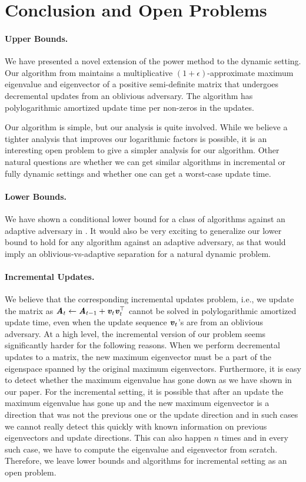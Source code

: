 

\section{Conclusion and Open Problems}\label{sec:open}


\paragraph{Upper Bounds.}
We have presented a novel extension of the power method to the dynamic setting. Our algorithm from  maintains a multiplicative $(1+\epsilon)$-approximate maximum eigenvalue and eigenvector of a positive semi-definite matrix that undergoes decremental updates from an oblivious adversary. The algorithm has polylogarithmic amortized update time per non-zeros in the updates. 

Our algorithm is simple, but our analysis is quite involved. While we believe a tighter analysis that improves our logarithmic factors is possible, it is an interesting open problem to give a simpler analysis for our algorithm. 
%
Other natural questions are whether we can get similar algorithms in incremental or fully dynamic settings and whether one can get a worst-case update time.


\paragraph{Lower Bounds.}
We have shown a conditional lower bound for a class of algorithms against an adaptive adversary in . It would also be very exciting to generalize our lower bound to hold for any algorithm against an adaptive adversary, as that would imply an oblivious-vs-adaptive separation for a natural dynamic problem. 

\paragraph{Incremental Updates.} We believe that the corresponding incremental updates problem, i.e., we update the matrix as $\boldsymbol{\mathit{A}}_t \gets \boldsymbol{\mathit{A}}_{t-1}+\boldsymbol{\mathit{v}}_t\boldsymbol{\mathit{v}}_t^{\top}$ cannot be solved in polylogarithmic amortized update time, even when the update sequence $\boldsymbol{\mathit{v}}_t$'s are from an oblivious adversary. 
At a high level, the incremental version of our problem seems significantly harder for the following reasons. When we perform decremental updates to a matrix, the new maximum eigenvector must be a part of the eigenspace spanned by the original maximum eigenvectors. Furthermore, it is easy to detect whether the maximum eigenvalue has gone down as we have shown in our paper. For the incremental setting, it is possible that after an update the maximum eigenvalue has gone up and the new maximum eigenvector is a direction that was not the previous one or the update direction and in such cases we cannot really detect this quickly with known information on previous eigenvectors and update directions. This can also happen $n$ times and in every such case, we have to compute the eigenvalue and eigenvector from scratch. Therefore, we leave lower bounds and algorithms for incremental setting as an open problem. 

